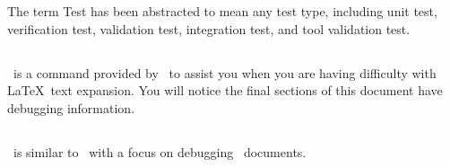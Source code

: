 The term Test has been abstracted to mean any test type, including unit test,
verification test, validation test, integration test, and tool validation test.

\subsection{\adTlcDebug}
\adTlcDebug\ is a command provided by \adTlcArticle\ to assist you when you are
having difficulty with \LaTeX\ text expansion.  You will notice the final
sections of this document have debugging information.

\subsection{\adAutoDocDebug}
\adAutoDocDebug\ is similar to \adTlcDebug\ with a focus on debugging \adAutoDoc\
documents.

